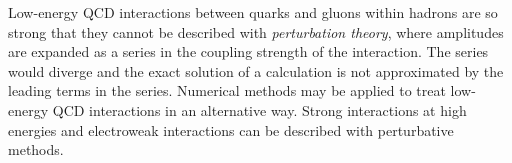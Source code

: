 %

Low-energy QCD interactions between quarks and gluons within hadrons are so strong that they cannot be described with \emph{perturbation
theory}, where amplitudes are expanded as a series in the coupling strength of the interaction. The series would diverge and the exact
solution of a calculation is not approximated by the leading terms in the series. Numerical methods may be applied to treat low-energy
QCD interactions in an alternative way. Strong interactions at high energies and electroweak interactions can be described with
perturbative methods.

